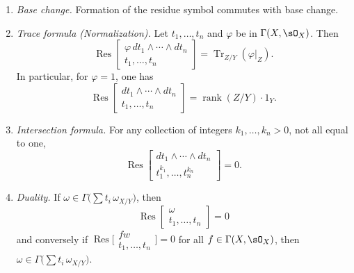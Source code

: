 \begin{enumerate}
\[
\operatorname{Res}_{X/Z}\begin{bmatrix} \omega\otimes_Y \omega' \\ t_1,\dots,t_n,s_1',\dots,s_p' \end{bmatrix} = \operatorname{Res}_{Y/Z}\begin{bmatrix} \omega\cdot\operatorname{Res}_{X/Y}\bigl[\begin{smallmatrix} \omega' \\ t_1,\dots,t_n \end{smallmatrix}\bigr] \\ s_1,\dots,s_p \end{bmatrix}.
\]
\item[(R5)]\label{res:R5} \emph{Base change.} Formation of the residue symbol commutes with base change.
\item[(R6)]\label{res:R6} \emph{Trace formula (Normalization).} Let $t_1,\dots,t_n$ and $\varphi$ be in $\Gamma(X,\sO_X)$. Then
\[
\operatorname{Res}\begin{bmatrix} \varphi\,dt_1\wedge\cdots\wedge dt_n \\ t_1,\dots,t_n \end{bmatrix} = \operatorname{Tr}_{Z/Y}(\varphi|_Z).
\]
In particular, for $\varphi=1$, one has
\[
\operatorname{Res}\begin{bmatrix} dt_1\wedge\cdots\wedge dt_n \\ t_1,\dots,t_n \end{bmatrix} = \operatorname{rank}(Z/Y)\cdot 1_Y.
\]
\item[(R7)]\label{res:R7} \emph{Intersection formula.} For any collection of integers $k_1,\dots,k_n>0$, not all equal to one,
\[
\operatorname{Res}\begin{bmatrix} dt_1\wedge\cdots\wedge dt_n \\ t_1^{k_1},\dots,t_n^{k_n} \end{bmatrix} = 0.
\]
\item[(R8)]\label{res:R8} \emph{Duality.} If $\omega\in\Gamma\bigl(\sum t_i\,\omega_{X/Y}\bigr)$, then
\[
\operatorname{Res}\begin{bmatrix} \omega \\ t_1,\dots,t_n \end{bmatrix} = 0
\]
and conversely if $\operatorname{Res}\bigl[\begin{smallmatrix} fw \\ t_1,\dots,t_n \end{smallmatrix}\bigr]=0$ for all $f\in\Gamma(X,\sO_X)$, then $\omega\in\Gamma\bigl(\sum t_i\,\omega_{X/Y}\bigr)$.

\end{enumerate}
